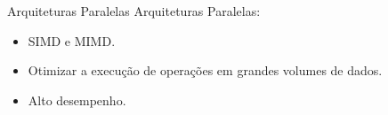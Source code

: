 \begin{frame}{Arquiteturas Paralelas}
    Arquiteturas Paralelas:

    \begin{itemize}
        \item SIMD e MIMD.
        \item Otimizar a execução de operações em grandes volumes de dados.
        \item Alto desempenho.
    \end{itemize}
\end{frame}